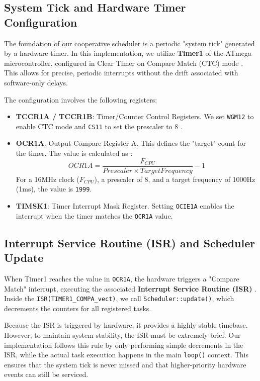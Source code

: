 \subsection{System Tick and Hardware Timer Configuration}

The foundation of our cooperative scheduler is a periodic "system tick" generated by a hardware timer. In this implementation, we utilize \textbf{Timer1} of the ATmega microcontroller, configured in Clear Timer on Compare Match (CTC) mode \cite{arduino_timer}. This allows for precise, periodic interrupts without the drift associated with software-only delays.

The configuration involves the following registers:
\begin{itemize}
    \item \textbf{TCCR1A / TCCR1B}: Timer/Counter Control Registers. We set \texttt{WGM12} to enable CTC mode and \texttt{CS11} to set the prescaler to 8 \cite{gammon_timers}.
    \item \textbf{OCR1A}: Output Compare Register A. This defines the "target" count for the timer. The value is calculated as \cite{arduino_timer}:
    \[ OCR1A = \frac{F_{CPU}}{Prescaler \times TargetFrequency} - 1 \]
    For a 16MHz clock ($F_{CPU}$), a prescaler of 8, and a target frequency of 1000Hz (1ms), the value is \texttt{1999}.
    \item \textbf{TIMSK1}: Timer Interrupt Mask Register. Setting \texttt{OCIE1A} enables the interrupt when the timer matches the \texttt{OCR1A} value.
\end{itemize}

\subsection{Interrupt Service Routine (ISR) and Scheduler Update}

When Timer1 reaches the value in \texttt{OCR1A}, the hardware triggers a "Compare Match" interrupt, executing the associated \textbf{Interrupt Service Routine (ISR)} \cite{arduino_interrupts}. Inside the \texttt{ISR(TIMER1\_COMPA\_vect)}, we call \texttt{Scheduler::update()}, which decrements the counters for all registered tasks.

Because the ISR is triggered by hardware, it provides a highly stable timebase. However, to maintain system stability, the ISR must be extremely brief. Our implementation follows this rule by only performing simple decrements in the ISR, while the actual task execution happens in the main \texttt{loop()} context. This ensures that the system tick is never missed and that higher-priority hardware events can still be serviced.

